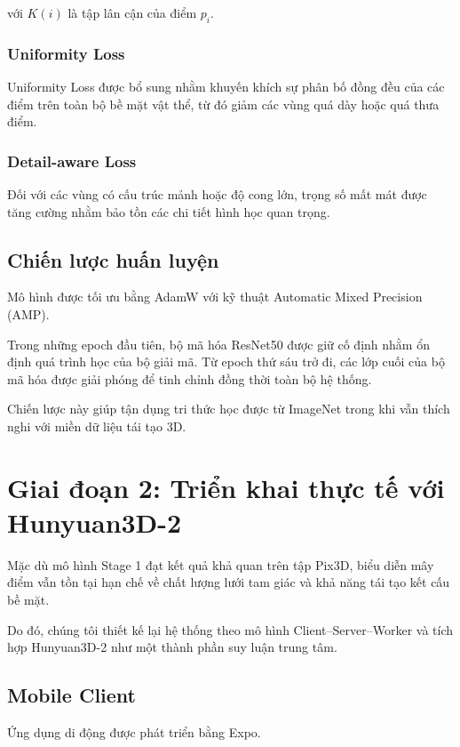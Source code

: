 \documentclass[conference,a4paper]{IEEEtran}
\begin{document}
với $K(i)$ là tập lân cận của điểm $p_i$.

\subsubsection{Uniformity Loss}

Uniformity Loss được bổ sung nhằm khuyến khích sự phân bố đồng đều của các điểm trên toàn bộ bề mặt vật thể, từ đó giảm các vùng quá dày hoặc quá thưa điểm.

\subsubsection{Detail-aware Loss}

Đối với các vùng có cấu trúc mảnh hoặc độ cong lớn, trọng số mất mát được tăng cường nhằm bảo tồn các chi tiết hình học quan trọng.

\subsection{Chiến lược huấn luyện}

Mô hình được tối ưu bằng AdamW với kỹ thuật Automatic Mixed Precision (AMP).

Trong những epoch đầu tiên, bộ mã hóa ResNet50 được giữ cố định nhằm ổn định quá trình học của bộ giải mã. Từ epoch thứ sáu trở đi, các lớp cuối của bộ mã hóa được giải phóng để tinh chỉnh đồng thời toàn bộ hệ thống.

Chiến lược này giúp tận dụng tri thức học được từ ImageNet trong khi vẫn thích nghi với miền dữ liệu tái tạo 3D.

\section{Giai đoạn 2: Triển khai thực tế với Hunyuan3D-2}

Mặc dù mô hình Stage 1 đạt kết quả khả quan trên tập Pix3D, biểu diễn mây điểm vẫn tồn tại hạn chế về chất lượng lưới tam giác và khả năng tái tạo kết cấu bề mặt.

Do đó, chúng tôi thiết kế lại hệ thống theo mô hình Client--Server--Worker và tích hợp Hunyuan3D-2 như một thành phần suy luận trung tâm.

\subsection{Mobile Client}

Ứng dụng di động được phát triển bằng Expo.
\end{document}
